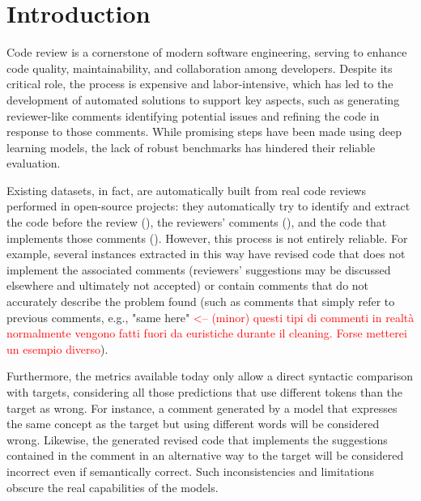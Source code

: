 \section{Introduction}
Code review is a cornerstone of modern software engineering, serving to enhance
code quality, maintainability, and collaboration among developers. Despite its critical
role, the process is expensive and labor-intensive, which has led to the development
of automated solutions to support key aspects, such as generating reviewer-like
comments identifying potential issues and refining the code in response to those comments.
While promising steps have been made using deep learning models, the lack of robust
benchmarks has hindered their reliable evaluation.

Existing datasets, in fact, are automatically built from real code reviews
performed in open-source projects: they automatically try to identify and
extract the code before the review (\subCode), the reviewers' comments
(\revComment), and the code that implements those comments (\revCode). However,
this process is not entirely reliable. For example, several instances extracted
in this way have revised code that does not implement the associated comments
(reviewers' suggestions may be discussed elsewhere and ultimately not accepted)
or contain comments that do not accurately describe the problem found (such as
comments that simply refer to previous comments, e.g., "same here" \textcolor{red}{<-- (minor) questi tipi di commenti in realtà normalmente vengono fatti fuori da euristiche durante il cleaning. Forse metterei un esempio diverso}).

Furthermore, the metrics available today only allow a direct syntactic comparison with targets,
considering all those predictions that use different tokens than the target as wrong. For instance,
a comment generated by a model that expresses the same concept as the target but using
different words will be considered wrong. Likewise, the generated revised code that implements
the suggestions contained in the comment in an alternative way to the target will be considered
incorrect even if semantically correct.
Such inconsistencies and limitations obscure the real capabilities of the models.


